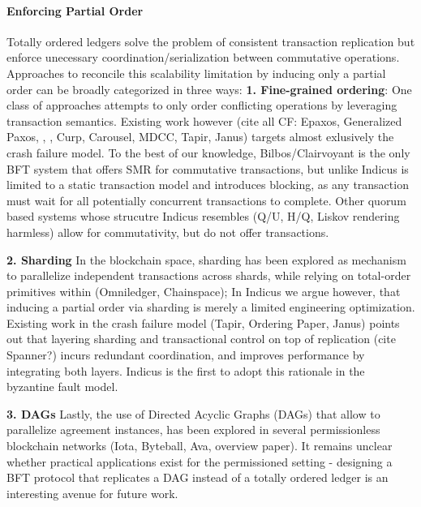 \paragraph{Enforcing Partial Order}
Totally ordered ledgers solve the problem of consistent transaction replication but enforce unecessary coordination/serialization between commutative operations. 
Approaches to reconcile this scalability limitation by inducing only a partial order can be broadly categorized in three ways:
\textbf{1. Fine-grained ordering}: One class of approaches attempts to only order conflicting operations by leveraging transaction semantics. Existing work however (cite all CF: Epaxos, Generalized Paxos, \cite{sutra2011fast}, \cite{li2012redblue}, Curp, Carousel, MDCC, Tapir, Janus) targets almost exlusively the crash failure model. To the best of our knowledge, Bilbos/Clairvoyant is the only BFT system that offers SMR for commutative transactions, but unlike Indicus is limited to a static transaction model and introduces blocking, as any transaction must wait for all potentially concurrent transactions to complete. Other quorum based systems whose strucutre Indicus resembles (Q/U, H/Q, Liskov rendering harmless) allow for commutativity, but do not offer transactions. 

\textbf{2. Sharding} In the blockchain space, sharding has been explored as mechanism to parallelize independent transactions across shards, while relying on total-order primitives within (Omniledger, Chainspace); In Indicus we argue however, that inducing a partial order via sharding is merely a limited engineering optimization. Existing work in the crash failure model (Tapir, Ordering Paper, Janus) points out that layering sharding and transactional control on top of replication (cite Spanner?) incurs redundant coordination, and improves performance by integrating both layers. Indicus is the first to adopt this rationale in the byzantine fault model.

\textbf{3. DAGs} Lastly, the use of Directed Acyclic Graphs (DAGs) that allow to parallelize agreement instances, has been explored in several permissionless blockchain networks (Iota, Byteball, Ava, overview paper). It remains unclear whether practical applications exist for the permissioned setting - designing a BFT protocol that replicates a DAG instead of a totally ordered ledger is an interesting avenue for future work.


